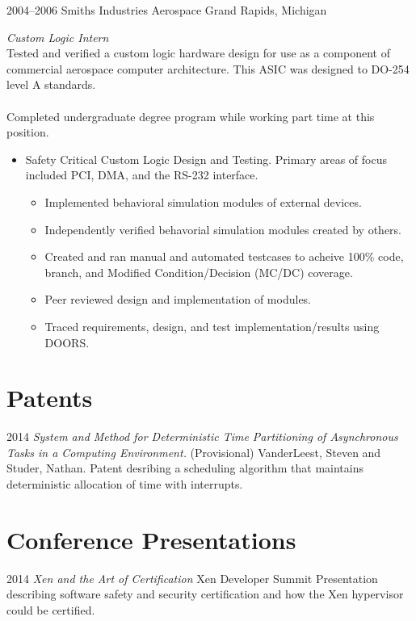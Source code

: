 \documentclass[print]{template/friggeri-cv} %
\begin{document}
\begin{entrylist}
\entry
{2004--2006}
{Smiths Industries Aerospace}
{Grand Rapids, Michigan}
{\emph{Custom Logic Intern} \\
Tested and verified a custom logic hardware design for use as a component of commercial aerospace computer architecture.  This ASIC was designed to DO-254 level A standards.  
\\
\\
Completed undergraduate degree program while working part time at this position.
\begin{itemize}
\item Safety Critical Custom Logic Design and Testing.  Primary areas of focus included PCI, DMA, and the RS-232 interface.
\begin{itemize}
\item Implemented behavioral simulation modules of external devices.
\item Independently verified behavorial simulation modules created by others.
\item Created and ran manual and automated testcases to acheive 100\% code, branch, and Modified Condition/Decision (MC/DC) coverage.
\item Peer reviewed design and implementation of modules.
\item Traced requirements, design, and test implementation/results using DOORS.
\end{itemize}
\end{itemize}}

\end{entrylist}

\section{Patents}

\begin{entrylist}
\entry
{2014}
{\emph{System and Method for Deterministic Time Partitioning of Asynchronous Tasks in a Computing Environment.} (Provisional)}
{VanderLeest, Steven and Studer, Nathan.}
{Patent desribing a scheduling algorithm that maintains deterministic allocation of time with interrupts.}
\end{entrylist}

\section{Conference Presentations}

\begin{entrylist}
\entry
{2014}
{\emph{Xen and the Art of Certification}}
{Xen Developer Summit}
{Presentation describing software safety and security certification and how the Xen hypervisor could be certified.}
\end{entrylist}
\end{document}
